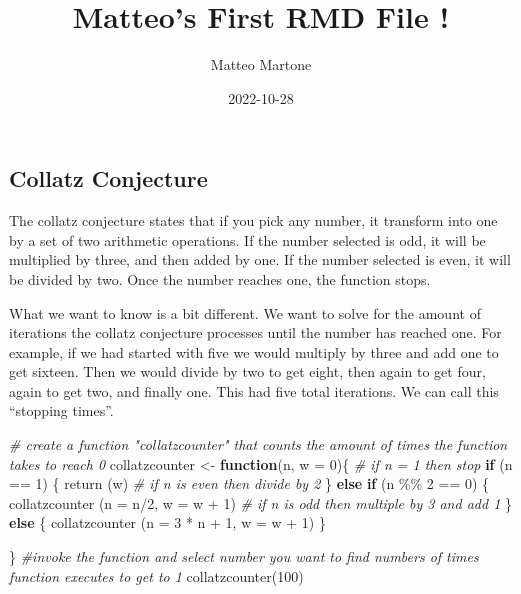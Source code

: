 \documentclass[
]{article}
\title{Matteo's First RMD File !}
\author{Matteo Martone}
\date{2022-10-28}
\newenvironment{Shaded}{\begin{snugshade}}{\end{snugshade}}
\newcommand{\AttributeTok}[1]{\textcolor[rgb]{0.77,0.63,0.00}{#1}}
\newcommand{\CommentTok}[1]{\textcolor[rgb]{0.56,0.35,0.01}{\textit{#1}}}
\newcommand{\ControlFlowTok}[1]{\textcolor[rgb]{0.13,0.29,0.53}{\textbf{#1}}}
\newcommand{\DecValTok}[1]{\textcolor[rgb]{0.00,0.00,0.81}{#1}}
\newcommand{\FunctionTok}[1]{\textcolor[rgb]{0.00,0.00,0.00}{#1}}
\newcommand{\NormalTok}[1]{#1}
\newcommand{\OtherTok}[1]{\textcolor[rgb]{0.56,0.35,0.01}{#1}}
\newcommand{\SpecialCharTok}[1]{\textcolor[rgb]{0.00,0.00,0.00}{#1}}
\begin{document}
\maketitle

\hypertarget{collatz-conjecture}{%
\subsection{Collatz Conjecture}\label{collatz-conjecture}}

The collatz conjecture states that if you pick any number, it transform
into one by a set of two arithmetic operations. If the number selected
is odd, it will be multiplied by three, and then added by one. If the
number selected is even, it will be divided by two. Once the number
reaches one, the function stops.

What we want to know is a bit different. We want to solve for the amount
of iterations the collatz conjecture processes until the number has
reached one. For example, if we had started with five we would multiply
by three and add one to get sixteen. Then we would divide by two to get
eight, then again to get four, again to get two, and finally one. This
had five total iterations. We can call this ``stopping times''.

\begin{Shaded}
\begin{Highlighting}[]
\CommentTok{\# create a function "collatzcounter" that counts the amount of times the function takes to reach 0 }
\NormalTok{collatzcounter }\OtherTok{\textless{}{-}} \ControlFlowTok{function}\NormalTok{(n, }\AttributeTok{w =} \DecValTok{0}\NormalTok{)\{}
  \CommentTok{\# if n = 1 then stop }
  \ControlFlowTok{if}\NormalTok{ (n }\SpecialCharTok{==} \DecValTok{1}\NormalTok{) \{}
    \FunctionTok{return}\NormalTok{ (w)}
  \CommentTok{\# if n is even then divide by 2}
\NormalTok{  \} }\ControlFlowTok{else} \ControlFlowTok{if}\NormalTok{ (n }\SpecialCharTok{\%\%} \DecValTok{2} \SpecialCharTok{==} \DecValTok{0}\NormalTok{) \{ }
    \FunctionTok{collatzcounter}\NormalTok{ (}\AttributeTok{n =}\NormalTok{ n}\SpecialCharTok{/}\DecValTok{2}\NormalTok{, }\AttributeTok{w =}\NormalTok{ w }\SpecialCharTok{+} \DecValTok{1}\NormalTok{)}
  \CommentTok{\# if n is odd then multiple by 3 and add 1 }
\NormalTok{  \} }\ControlFlowTok{else}\NormalTok{ \{}
    \FunctionTok{collatzcounter}\NormalTok{ (}\AttributeTok{n =} \DecValTok{3} \SpecialCharTok{*}\NormalTok{ n }\SpecialCharTok{+} \DecValTok{1}\NormalTok{, }\AttributeTok{w =}\NormalTok{ w }\SpecialCharTok{+} \DecValTok{1}\NormalTok{)}
\NormalTok{  \}}
 
\NormalTok{\}}
\CommentTok{\#invoke the function and select number you want to find numbers of times function executes to get to 1}
\FunctionTok{collatzcounter}\NormalTok{(}\DecValTok{100}\NormalTok{)}
\end{Highlighting}
\end{Shaded}
\end{document}
